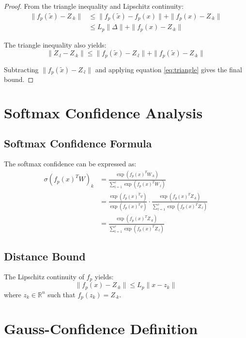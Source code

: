 \begin{proof}
From the triangle inequality and Lipschitz continuity:
\begin{align}
\|f_p(\tilde{x}) - Z_{\cdot k}\| &\leq \|f_p(\tilde{x}) - f_p(x)\| + \|f_p(x) - Z_{\cdot k}\| \\
&\leq L_p \|\Delta\| + \|f_p(x) - Z_{\cdot k}\| \label{eq:triangle}
\end{align}

The triangle inequality also yields:
\begin{equation}
\|Z_{\cdot l} - Z_{\cdot k}\| \leq \|f_p(\tilde{x}) - Z_{\cdot l}\| + \|f_p(\tilde{x}) - Z_{\cdot k}\|
\end{equation}

Subtracting $\|f_p(\tilde{x}) - Z_{\cdot l}\|$ and applying equation \eqref{eq:triangle} gives the final bound.
\end{proof}

\section{Softmax Confidence Analysis}

\subsection{Softmax Confidence Formula}

The softmax confidence can be expressed as:
\begin{align}
\sigma(f_p(x)^T W)_k &= \frac{\exp(f_p(x)^T W_{\cdot k})}{\sum_{l=1}^c \exp(f_p(x)^T W_{\cdot l})} \\
&= \frac{\exp(f_p(x)^T v)}{\exp(f_p(x)^T v)} \cdot \frac{\exp(f_p(x)^T Z_{\cdot k})}{\sum_{l=1}^c \exp(f_p(x)^T Z_{\cdot l})} \\
&= \frac{\exp(f_p(x)^T Z_{\cdot k})}{\sum_{l=1}^c \exp(f_p(x)^T Z_{\cdot l})}
\end{align}

\subsection{Distance Bound}

The Lipschitz continuity of $f_p$ yields:
\begin{equation}
\|f_p(x) - Z_{\cdot k}\| \leq L_p \|x - z_k\|
\end{equation}
where $z_k \in \mathbb{R}^n$ such that $f_p(z_k) = Z_{\cdot k}$.

\section{Gauss-Confidence Definition}

